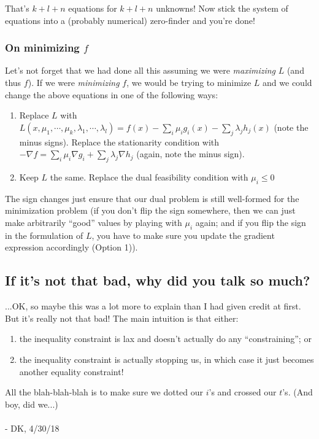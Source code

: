 \documentclass[letterpaper,12pt]{report}
\providecommand{\tightlist}{%
  \setlength{\itemsep}{0pt}\setlength{\parskip}{0pt}}
\begin{document}
That's \(k + l + n\) equations for \(k + l + n\) unknowns! Now stick the
system of equations into a (probably numerical) zero-finder and you're
done!

\subsubsection{\texorpdfstring{On minimizing
\(f\)}{On minimizing f}}\label{on-minimizing-f}

Let's not forget that we had done all this assuming we were
\emph{maximizing} \(L\) (and thus \(f\)). If we were \emph{minimizing}
\(f\), we would be trying to minimize \(L\) and we could change the
above equations in one of the following ways:

\begin{enumerate}
\def\labelenumi{\arabic{enumi}.}
\tightlist
\item
  Replace \(L\) with
  \(L(x,\mu_1, \cdots, \mu_k, \lambda_1, \cdots, \lambda_l) = f(x) - \sum_i \mu_i g_i(x) - \sum_j \lambda_j h_j(x)\)
  (note the minus signs). Replace the stationarity condition with
  \(-\nabla f = \sum _i \mu _i \nabla g_i + \sum _j \lambda _j \nabla h_j\)
  (again, note the minus sign).
\item
  Keep \(L\) the same. Replace the dual feasibility condition with \(
  \mu_i \leq 0 \)
\end{enumerate}

The sign changes just ensure that our dual problem is still well-formed
for the minimization problem (if you don't flip the sign somewhere, then
we can just make arbitrarily ``good'' values by playing with \(\mu_i\)
again; and if you flip the sign in the formulation of \(L\), you have to
make sure you update the gradient expression accordingly (Option 1)).

\subsection{If it's not that bad, why did you talk so
much?}\label{if-its-not-that-bad-why-did-you-talk-so-much}

...OK, so maybe this was a lot more to explain than I had given credit
at first. But it's really not that bad! The main intuition is that either:
\begin{enumerate}
  \tightlist
  \item
    the inequality constraint is lax and doesn't actually do any
``constraining''; or 
  \item 
    the inequality constraint is actually stopping us,
    in which case it just becomes another equality constraint!
\end{enumerate}
All the blah-blah-blah is to make sure we dotted our \(i\)'s and crossed
our \(t\)'s. (And boy, did we...)
\\
\\
- DK, 4/30/18
\end{document}
